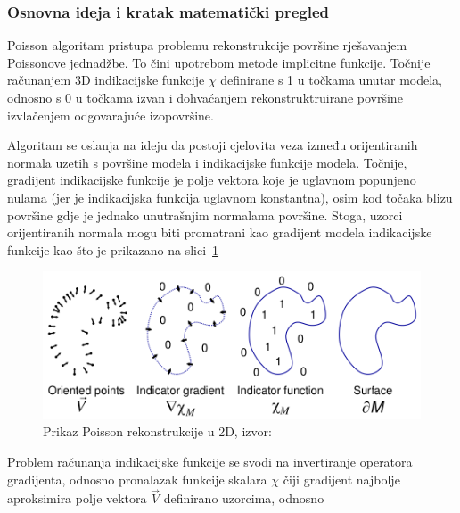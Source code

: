 

\subsubsection{Osnovna ideja i kratak matematički pregled} %
\label{ssub:Osnovna ideja i kratak matematički pregled}

Poisson algoritam pristupa problemu rekonstrukcije površine rješavanjem
Poissonove jednadžbe. To čini upotrebom metode implicitne funkcije.
Točnije računanjem 3D indikacijske funkcije \(\chi\) definirane s 1 u
točkama unutar modela, odnosno s 0 u točkama izvan i dohvaćanjem
rekonstruktruirane površine izvlačenjem odgovarajuće izopovršine.

Algoritam se oslanja na ideju da postoji cjelovita veza između
orijentiranih normala uzetih s površine modela i indikacijske funkcije
modela. Točnije, gradijent indikacijske funkcije je polje vektora koje
je uglavnom popunjeno nulama (jer je indikacijska funkcija uglavnom
konstantna), osim kod točaka blizu površine gdje je jednako unutrašnjim
normalama površine. Stoga, uzorci orijentiranih normala mogu biti
promatrani kao gradijent modela indikacijske funkcije kao što je
prikazano na slici~\ref{fig:poisson-reconstruction.png}

\begin{figure}[h]
\centering
\includegraphics[scale=0.35]{figures/poisson-reconstruction.png}
\caption[]{Prikaz Poisson rekonstrukcije u 2D,
    izvor:~\cite{Kazhdan:2006}}
\label{fig:poisson-reconstruction.png}
\end{figure}

Problem računanja indikacijske funkcije se svodi na invertiranje
operatora gradijenta, odnosno pronalazak funkcije skalara \(\chi\) čiji
gradijent najbolje aproksimira polje vektora \(\vec{V}\) definirano
uzorcima, odnosno 

